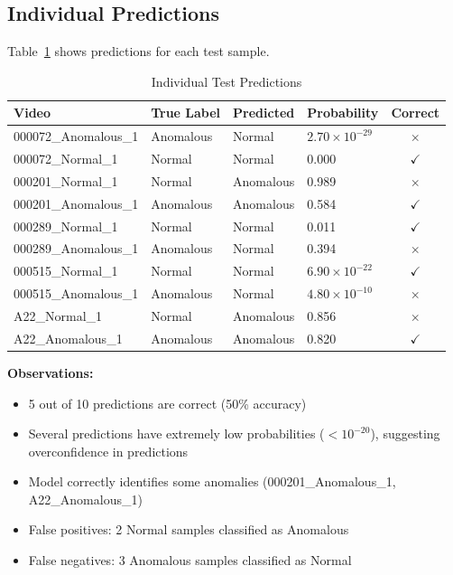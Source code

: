 \documentclass[11pt,a4paper]{article}
\begin{document}
\subsection{Individual Predictions}

Table~\ref{tab:individual_predictions} shows predictions for each test sample.

\begin{table}[H]
\centering
\caption{Individual Test Predictions}
\label{tab:individual_predictions}
\scriptsize
\begin{tabular}{llllc}
\toprule
\textbf{Video} & \textbf{True Label} & \textbf{Predicted} & \textbf{Probability} & \textbf{Correct} \\
\midrule
000072\_Anomalous\_1 & Anomalous & Normal & $2.70 \times 10^{-29}$ & $\times$ \\
000072\_Normal\_1 & Normal & Normal & 0.000 & $\checkmark$ \\
000201\_Normal\_1 & Normal & Anomalous & 0.989 & $\times$ \\
000201\_Anomalous\_1 & Anomalous & Anomalous & 0.584 & $\checkmark$ \\
000289\_Normal\_1 & Normal & Normal & 0.011 & $\checkmark$ \\
000289\_Anomalous\_1 & Anomalous & Normal & 0.394 & $\times$ \\
000515\_Normal\_1 & Normal & Normal & $6.90 \times 10^{-22}$ & $\checkmark$ \\
000515\_Anomalous\_1 & Anomalous & Normal & $4.80 \times 10^{-10}$ & $\times$ \\
A22\_Normal\_1 & Normal & Anomalous & 0.856 & $\times$ \\
A22\_Anomalous\_1 & Anomalous & Anomalous & 0.820 & $\checkmark$ \\
\bottomrule
\end{tabular}
\end{table}

\textbf{Observations:}
\begin{itemize}
    \item 5 out of 10 predictions are correct (50\% accuracy)
    \item Several predictions have extremely low probabilities ($< 10^{-20}$), suggesting overconfidence in predictions
    \item Model correctly identifies some anomalies (000201\_Anomalous\_1, A22\_Anomalous\_1)
    \item False positives: 2 Normal samples classified as Anomalous
    \item False negatives: 3 Anomalous samples classified as Normal
\end{itemize}
\end{document}
